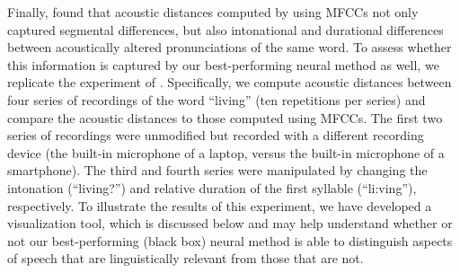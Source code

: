 \documentclass[11pt,a4paper]{article}
\begin{document}

Finally, \citet{acoustic-measure} found that acoustic distances computed by using MFCCs not only captured segmental differences, but also intonational and durational differences between acoustically altered pronunciations of the same word. To assess whether this information is captured by our best-performing neural method as well, we replicate the experiment of \citet{acoustic-measure}. Specifically, we compute acoustic distances between four series of recordings of the word ``living'' (ten repetitions per series) and compare the acoustic distances to those computed using MFCCs. The first two series of recordings were unmodified but recorded with a different recording device (the built-in microphone of a laptop, versus the built-in microphone of a smartphone). The third and fourth series were manipulated by changing the intonation (``living?'') and relative duration of the first syllable (``li:ving''), respectively. To illustrate the results of this experiment, we have developed a visualization tool, which is discussed below and may help understand whether or not our best-performing (black box) neural method is able to distinguish aspects of speech that are linguistically relevant from those that are not.
\end{document}
